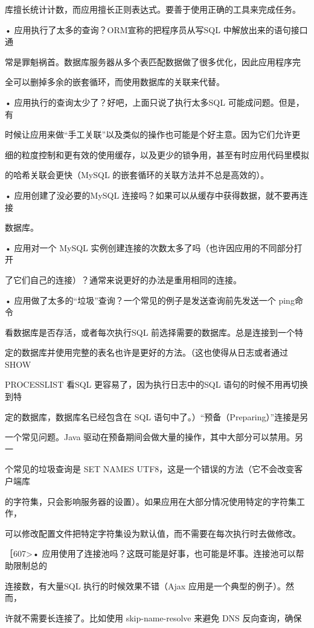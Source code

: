 库擅长统计计数，而应用擅长正则表达式。要善于使用正确的工具来完成任务。

• 应用执行了太多的查询？ORM宣称的把程序员从写SQL 中解放出来的语句接口通

常是罪魁祸首。数据库服务器从多个表匹配数据做了很多优化，因此应用程序完

全可以删掉多余的嵌套循环，而使用数据库的关联来代替。

• 应用执行的查询太少了？好吧，上面只说了执行太多SQL 可能成问题。但是，有

时候让应用来做“手工关联”以及类似的操作也可能是个好主意。因为它们允许更

细的粒度控制和更有效的使用缓存，以及更少的锁争用，甚至有时应用代码里模拟

的哈希关联会更快（MySQL 的嵌套循环的关联方法并不总是高效的）。

• 应用创建了没必要的MySQL 连接吗？如果可以从缓存中获得数据，就不要再连接

数据库。

• 应用对一个 MySQL 实例创建连接的次数太多了吗（也许因应用的不同部分打开

了它们自己的连接）？通常来说更好的办法是重用相同的连接。

• 应用做了太多的“垃圾”查询？一个常见的例子是发送查询前先发送一个 ping命令

看数据库是否存活，或者每次执行SQL 前选择需要的数据库。总是连接到一个特

定的数据库并使用完整的表名也许是更好的方法。（这也使得从日志或者通过 SHOW

PROCESSLIST 看SQL 更容易了，因为执行日志中的SQL 语句的时候不用再切换到特

定的数据库，数据库名已经包含在 SQL 语句中了。）“预备（Preparing）”连接是另

一个常见问题。Java 驱动在预备期间会做大量的操作，其中大部分可以禁用。另一

个常见的垃圾查询是 SET NAMES UTF8，这是一个错误的方法（它不会改变客户端库

的字符集，只会影响服务器的设置）。如果应用在大部分情况使用特定的字符集工作，

可以修改配置文件把特定字符集设为默认值，而不需要在每次执行时去做修改。

［607>• 应用使用了连接池吗？这既可能是好事，也可能是坏事。连接池可以帮助限制总的

连接数，有大量SQL 执行的时候效果不错（Ajax 应用是一个典型的例子）。然而，

许就不需要长连接了。比如使用 skip-name-resolve 来避免 DNS 反向查询，确保

